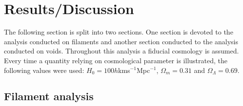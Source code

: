 \chapter{Results/Discussion}\label{sec:results}
The following section is split into two sections. One section is devoted to the analysis conducted on filaments and another section conducted to the analysis conducted on voids. Throughout this analysis a fiducial cosmology is assumed. Every time a quantity relying on cosmological parameter is illustrated, the following values were used: $H_0=100h$kms$^{-1}$Mpc$^{-1}$, $\Omega_m=0.31$ and $\Omega_\Lambda=0.69$.
\section{Filament analysis}\label{sec:filaments}


